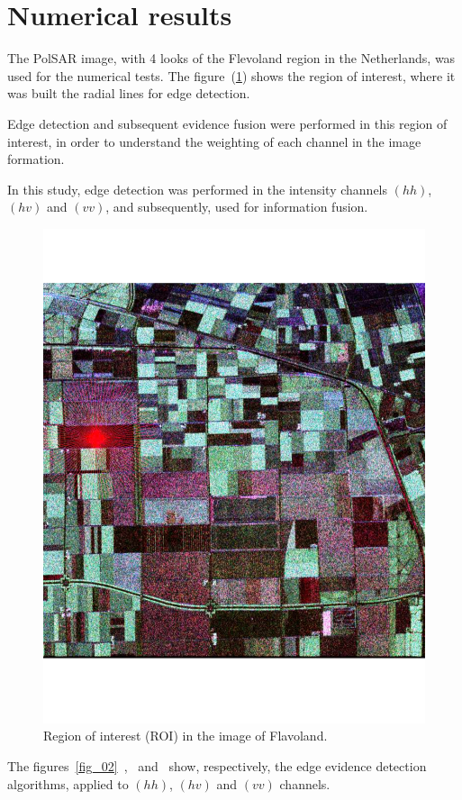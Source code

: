 \documentclass[conference]{IEEEtran}
\begin{document}
\section{Numerical results}\label{sec_07}
The PolSAR image, with 4 looks of the Flevoland region in the Netherlands, was used for the numerical tests. The figure~(\ref{fig_01}) shows the region of interest, where it was built the radial lines for edge detection.

 Edge detection and subsequent evidence fusion were performed in this region of interest, in order to understand the weighting of each channel in the image formation.

In this study, edge detection was performed in the intensity channels $(hh)$, $(hv)$ and $(vv)$, and subsequently, used for information fusion. 
\begin{figure}[hbt]
\centering
	\includegraphics[scale=0.3]{flevoland_radial_4_look.pdf}
			\vspace{-1.0cm}
	\caption{Region of interest (ROI) in the image of Flavoland.}
\label{fig_01}
\end{figure}
The figures~\ref{fig_02}~,~ and~ show, respectively, the edge evidence detection algorithms, applied to $(hh)$, $(hv)$ and $(vv)$ channels. 
\end{document}
